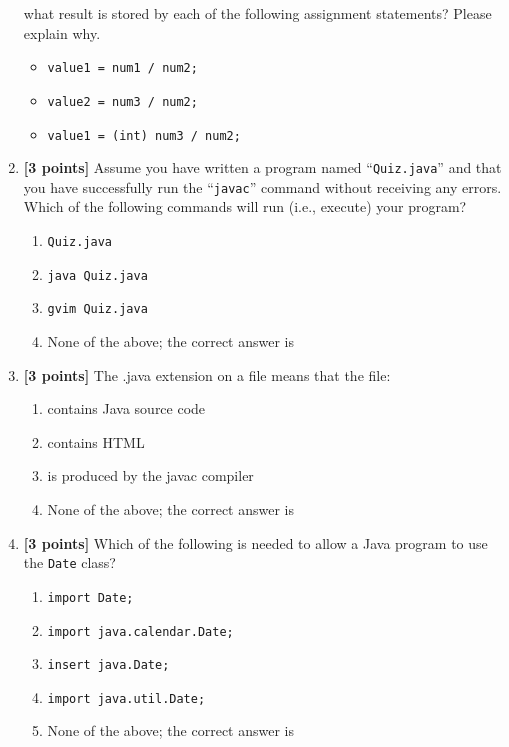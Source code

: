 \begin{enumerate}
 what result is stored by each of the following assignment statements? Please explain why.
 \begin{itemize}
 \item {\tt value1 = num1 / num2;}
 
\vspace{0.3in}
 \item {\tt value2 = num3 / num2;}
 
\vspace{0.3in}
 \item {\tt value1 = (int) num3 / num2;}
 
\vspace{0.3in}
 \end{itemize}


\item {\bf [3 points]}
Assume you have written a program named ``{\tt Quiz.java}'' and that you have 
successfully run the ``{\tt javac}'' command without receiving any  errors. 
Which of the following commands will run (i.e., execute) your program?
\begin{enumerate}
\item \verb$Quiz.java$

\medskip
\item \verb$java Quiz.java$

\medskip 
\item \verb$gvim Quiz.java$

\medskip
\item None of the above; the correct answer is \underline{\hspace{3in}}
\end{enumerate}


\bigskip
\bigskip


\item {\bf [3 points]}
The .java extension on a file means that the file:
\begin{enumerate}
\item contains Java source code
\medskip 
\item contains HTML
\medskip 
\item is produced by the javac compiler
\medskip
\item None of the above; the correct answer is \underline{\hspace{3in}}
\end{enumerate}

\bigskip
\bigskip

\item {\bf [3 points]}
  Which of the following is needed to allow a Java program to use the {\tt Date} class?
  \begin{enumerate}
    \item {\tt import Date;}
      \medskip 
    \item {\tt import java.calendar.Date;}
      \medskip 
    \item {\tt insert java.Date;}
      \medskip
    \item {\tt import java.util.Date;}
      \medskip
    \item None of the above; the correct answer is \underline{\hspace{3in}}
  \end{enumerate}


\end{enumerate}

